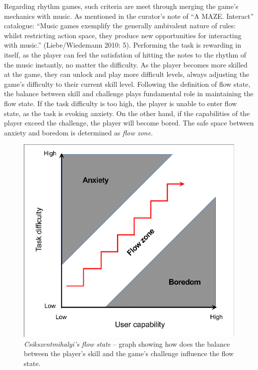 Regarding rhythm games, such criteria are meet through merging the game’s mechanics with music. As mentioned in the curator’s note of “A MAZE. Interact” \cite{MAZE} catalogue: “Music games exemplify the generally ambivalent nature of rules: whilst restricting action space, they produce new opportunities for interacting with music.” (Liebe/Wiedemann 2010: 5). Performing the task is rewarding in itself, as the player can feel the satisfation of hitting the notes to the rhythm of the music instantly, no matter the difficulty. As the player becomes more skilled at the game, they can unlock and play more difficult levels, always adjusting the game’s difficulty to their current skill level. Following the definition of flow state, the balance between skill and challenge plays fundamental role in maintaining the flow state. If the task difficulty is too high, the player is unable to enter flow state, as the task is evoking anxiety. On the other hand, if the capabilities of the player exceed the challenge, the player will become bored. The safe space between anxiety and boredom is determined as \textit{flow zone}.

\begin{figure}[h]
    \centering\includegraphics[scale=0.3]{obrazki/flowstategraph.png}
    \caption{\textit{Csikszentmihalyi’s flow state} -- graph showing how does the balance between the player’s skill and the game’s challenge influence the flow state.
    \cite{csikszentmihalyi1990flow}}
    \label{fig:flowstategraph}
\end{figure}


